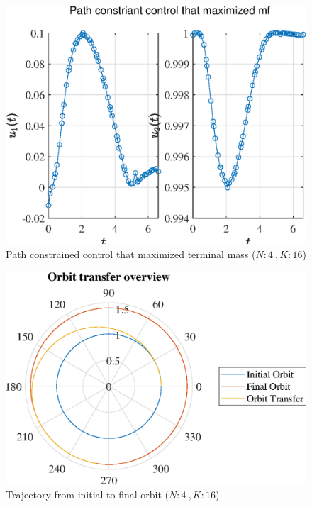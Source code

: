 \documentclass[]{article}
\begin{document}
	\begin{figure}
		\centering
		\includegraphics[scale=0.75]{path_N4_K16_C3_mf.eps}
		\caption{Path constrained control that maximized terminal mass (\(N:4\ , K:16\))}
		\label{fig:path_N4_K16_C3_mf}
	\end{figure}
	\begin{figure}
		\centering
		\includegraphics[scale=0.75]{orbit_N4_K16_C3_mf.eps}
		\caption{Trajectory from initial to final orbit (\(N:4\ , K:16\))}
		\label{fig:orbit_N4_K16_C3_mf}
	\end{figure}
\end{document}
